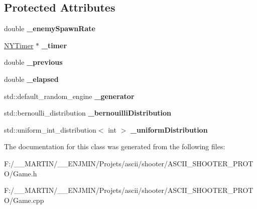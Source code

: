 \subsection*{Protected Attributes}
\begin{DoxyCompactItemize}
\item 
\hypertarget{class_game_a24743764a183ce755b12282940d5aa9d}{}\label{class_game_a24743764a183ce755b12282940d5aa9d} 
double {\bfseries \+\_\+enemy\+Spawn\+Rate}
\item 
\hypertarget{class_game_a28155935797d67083587e848effc1eb8}{}\label{class_game_a28155935797d67083587e848effc1eb8} 
\hyperlink{class_n_y_timer}{N\+Y\+Timer} $\ast$ {\bfseries \+\_\+timer}
\item 
\hypertarget{class_game_a4bcab81144d9676362e8e964337e43a1}{}\label{class_game_a4bcab81144d9676362e8e964337e43a1} 
double {\bfseries \+\_\+previous}
\item 
\hypertarget{class_game_a546c6124b218181cac529da2bcf47de4}{}\label{class_game_a546c6124b218181cac529da2bcf47de4} 
double {\bfseries \+\_\+elapsed}
\item 
\hypertarget{class_game_a82b8447c7ca1d8a6114f97fb15bbcc00}{}\label{class_game_a82b8447c7ca1d8a6114f97fb15bbcc00} 
std\+::default\+\_\+random\+\_\+engine {\bfseries \+\_\+generator}
\item 
\hypertarget{class_game_a7731391cbc79c28c8fbecf3ee4bf5ca5}{}\label{class_game_a7731391cbc79c28c8fbecf3ee4bf5ca5} 
std\+::bernoulli\+\_\+distribution {\bfseries \+\_\+bernouilli\+Distribution}
\item 
\hypertarget{class_game_a20a7cd8706d26ec0c45bbe52f84b2e81}{}\label{class_game_a20a7cd8706d26ec0c45bbe52f84b2e81} 
std\+::uniform\+\_\+int\+\_\+distribution$<$ int $>$ {\bfseries \+\_\+uniform\+Distribution}
\end{DoxyCompactItemize}


The documentation for this class was generated from the following files\+:\begin{DoxyCompactItemize}
\item 
F\+:/\+\_\+\+\_\+\+M\+A\+R\+T\+I\+N/\+\_\+\+\_\+\+E\+N\+J\+M\+I\+N/\+Projets/ascii/shooter/\+A\+S\+C\+I\+I\+\_\+\+S\+H\+O\+O\+T\+E\+R\+\_\+\+P\+R\+O\+T\+O/Game.\+h\item 
F\+:/\+\_\+\+\_\+\+M\+A\+R\+T\+I\+N/\+\_\+\+\_\+\+E\+N\+J\+M\+I\+N/\+Projets/ascii/shooter/\+A\+S\+C\+I\+I\+\_\+\+S\+H\+O\+O\+T\+E\+R\+\_\+\+P\+R\+O\+T\+O/Game.\+cpp\end{DoxyCompactItemize}
